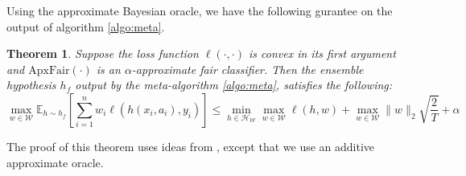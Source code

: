 \documentclass{article}
\newtheorem{theorem}{Theorem}
\newcommand{\E}{\mathbb{E}}
\newcommand{\WW}{\mathcal{W}}
\newcommand{\HH}{\mathcal{H}}
\newcommand{\AF}{\textrm{ApxFair}}
\newcommand{\norm}[1]{\lVert #1 \rVert}
\begin{document}
Using the approximate Bayesian oracle, we have the following gurantee on the output of algorithm \ref{algo:meta}. 
\begin{theorem}\label{thm:meta-algo-result}
Suppose the loss function $\ell(\cdot,\cdot)$ is convex in its first argument and $\AF(\cdot)$ is an $\alpha$-approximate fair classifier. Then the ensemble hypothesis $h_f$ output by the meta-algorithm \ref{algo:meta}, satisfies the following:
$$\max_{w \in \WW} \E_{h \sim h_f}\left[ \sum_{i=1}^n w_i \ell(h(x_i,a_i),y_i)\right] \le \min_{h \in {\HH}_{\WW} } \max_{w \in \WW} \ell(h,w) + \max_{w \in \WW} \norm{w}_2 \sqrt{\frac{2}{T}} + \alpha$$
\end{theorem}
The proof of this theorem uses ideas from \cite{CLSS17}, except that we use an additive approximate oracle. 
\end{document}
